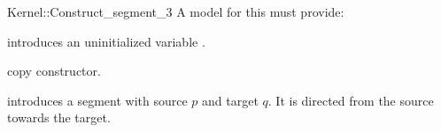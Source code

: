 \begin{ccRefFunctionObjectConcept}{Kernel::Construct_segment_3}
A model for this must provide:



\ccHidden {}
             {introduces an uninitialized variable .}

\ccHidden {}
 	    {copy constructor.}

            {introduces a segment  with source $p$
             and target $q$. It is directed from the source towards
             the target.}


\end{ccRefFunctionObjectConcept}
